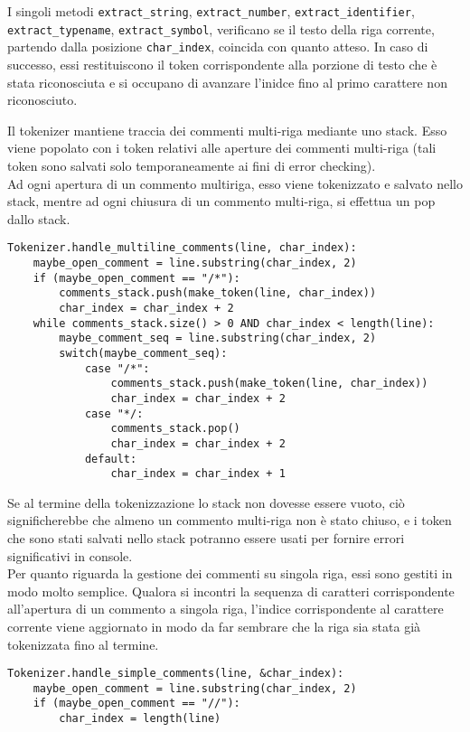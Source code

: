 I singoli metodi \texttt{extract\_string}, \texttt{extract\_number}, 
\texttt{extract\_identifier}, \texttt{extract\_typename}, 
\texttt{extract\_symbol}, verificano se il testo della riga corrente, 
partendo dalla posizione \texttt{char\_index}, coincida con quanto 
atteso. In caso di successo, essi restituiscono il token corrispondente 
alla porzione di testo che è stata riconosciuta e si occupano di 
avanzare l'inidce fino al primo carattere non riconosciuto. 

\newpage

Il tokenizer mantiene traccia dei commenti multi-riga mediante uno 
stack. Esso viene popolato con i token relativi alle aperture dei 
commenti multi-riga (tali token sono salvati solo temporaneamente ai 
fini di error checking). \\

Ad ogni apertura di un commento multiriga, esso viene tokenizzato 
e salvato nello stack, mentre ad ogni chiusura di un commento multi-riga, 
si effettua un pop dallo stack. \\


\vspace{0.5cm}
\begin{lstlisting}[frame=single]
Tokenizer.handle_multiline_comments(line, char_index):
    maybe_open_comment = line.substring(char_index, 2)
    if (maybe_open_comment == "/*"):
        comments_stack.push(make_token(line, char_index))
        char_index = char_index + 2
    while comments_stack.size() > 0 AND char_index < length(line):
        maybe_comment_seq = line.substring(char_index, 2)
        switch(maybe_comment_seq):
            case "/*": 
                comments_stack.push(make_token(line, char_index))
                char_index = char_index + 2
            case "*/:
                comments_stack.pop()
                char_index = char_index + 2
            default:
                char_index = char_index + 1
\end{lstlisting}    
\vspace{0.5cm}

Se al termine della tokenizzazione lo stack non dovesse essere vuoto, 
ciò significherebbe che almeno un commento multi-riga non è stato chiuso, 
e i token che sono stati salvati nello stack potranno essere usati 
per fornire errori significativi in console. \\

Per quanto riguarda la gestione dei commenti su singola riga, essi 
sono gestiti in modo molto semplice. Qualora si incontri la sequenza
di caratteri corrispondente all'apertura di un commento a singola riga, 
l'indice corrispondente al carattere corrente viene aggiornato 
in modo da far sembrare che la riga sia stata già tokenizzata fino al termine.


\vspace{0.5cm}
\begin{lstlisting}[frame=single]
Tokenizer.handle_simple_comments(line, &char_index):
    maybe_open_comment = line.substring(char_index, 2)
    if (maybe_open_comment == "//"):
        char_index = length(line)
\end{lstlisting}    
\vspace{0.5cm}